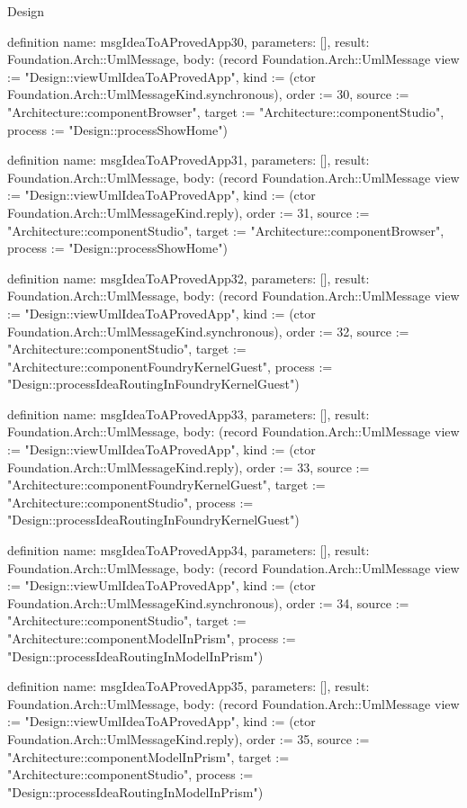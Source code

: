 \begin{lexlean}{Design}
\begin{semanticmodule}
definition{
  name: msgIdeaToAProvedApp30,
  parameters: [],
  result: Foundation.Arch::UmlMessage,
  body: (record Foundation.Arch::UmlMessage {view := "Design::viewUmlIdeaToAProvedApp", kind := (ctor Foundation.Arch::UmlMessageKind.synchronous), order := 30, source := "Architecture::componentBrowser", target := "Architecture::componentStudio", process := "Design::processShowHome"})
}

definition{
  name: msgIdeaToAProvedApp31,
  parameters: [],
  result: Foundation.Arch::UmlMessage,
  body: (record Foundation.Arch::UmlMessage {view := "Design::viewUmlIdeaToAProvedApp", kind := (ctor Foundation.Arch::UmlMessageKind.reply), order := 31, source := "Architecture::componentStudio", target := "Architecture::componentBrowser", process := "Design::processShowHome"})
}

definition{
  name: msgIdeaToAProvedApp32,
  parameters: [],
  result: Foundation.Arch::UmlMessage,
  body: (record Foundation.Arch::UmlMessage {view := "Design::viewUmlIdeaToAProvedApp", kind := (ctor Foundation.Arch::UmlMessageKind.synchronous), order := 32, source := "Architecture::componentStudio", target := "Architecture::componentFoundryKernelGuest", process := "Design::processIdeaRoutingInFoundryKernelGuest"})
}

definition{
  name: msgIdeaToAProvedApp33,
  parameters: [],
  result: Foundation.Arch::UmlMessage,
  body: (record Foundation.Arch::UmlMessage {view := "Design::viewUmlIdeaToAProvedApp", kind := (ctor Foundation.Arch::UmlMessageKind.reply), order := 33, source := "Architecture::componentFoundryKernelGuest", target := "Architecture::componentStudio", process := "Design::processIdeaRoutingInFoundryKernelGuest"})
}

definition{
  name: msgIdeaToAProvedApp34,
  parameters: [],
  result: Foundation.Arch::UmlMessage,
  body: (record Foundation.Arch::UmlMessage {view := "Design::viewUmlIdeaToAProvedApp", kind := (ctor Foundation.Arch::UmlMessageKind.synchronous), order := 34, source := "Architecture::componentStudio", target := "Architecture::componentModelInPrism", process := "Design::processIdeaRoutingInModelInPrism"})
}

definition{
  name: msgIdeaToAProvedApp35,
  parameters: [],
  result: Foundation.Arch::UmlMessage,
  body: (record Foundation.Arch::UmlMessage {view := "Design::viewUmlIdeaToAProvedApp", kind := (ctor Foundation.Arch::UmlMessageKind.reply), order := 35, source := "Architecture::componentModelInPrism", target := "Architecture::componentStudio", process := "Design::processIdeaRoutingInModelInPrism"})
}


\end{semanticmodule}
\end{lexlean}
